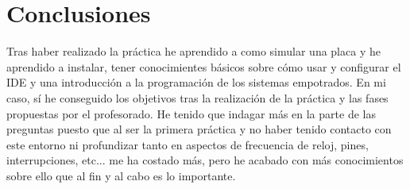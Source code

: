 \documentclass[11pt,a4paper]{article}
\begin{document}
	\section{Conclusiones}
	Tras haber realizado la práctica he aprendido a como simular una placa y he aprendido a instalar, tener conocimientes básicos sobre cómo usar y configurar el IDE y una introducción a la programación de los sistemas empotrados. En mi caso, sí he conseguido los objetivos tras la realización de la práctica y las fases propuestas por el profesorado. He tenido que indagar más en la parte de las preguntas puesto que al ser la primera práctica y no haber tenido contacto con este entorno ni profundizar tanto en aspectos de frecuencia de reloj, pines, interrupciones, etc... me ha costado más, pero he acabado con más conocimientos sobre ello que al fin y al cabo es lo importante.
\end{document}
